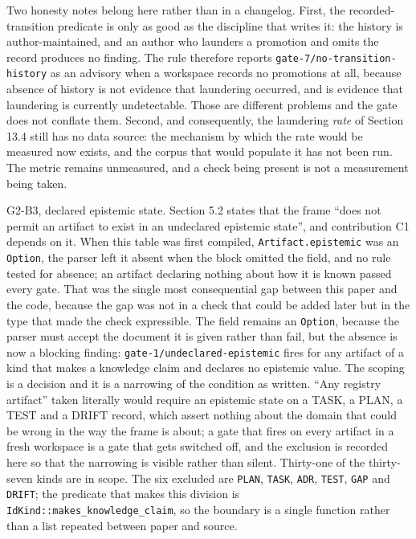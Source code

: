 \documentclass[11pt,a4paper]{article}
\begin{document}
Two honesty notes belong here rather than in a changelog. First, the recorded-transition predicate is only as good as the discipline that writes it: the history is author-maintained, and an author who launders a promotion and omits the record produces no finding. The rule therefore reports \texttt{gate-7/no-transition-history} as an advisory when a workspace records no promotions at all, because absence of history is not evidence that laundering occurred, and is evidence that laundering is currently undetectable. Those are different problems and the gate does not conflate them. Second, and consequently, the laundering \emph{rate} of Section 13.4 still has no data source: the mechanism by which the rate would be measured now exists, and the corpus that would populate it has not been run. The metric remains unmeasured, and a check being present is not a measurement being taken.

G2-B3, declared epistemic state. Section 5.2 states that the frame ``does not permit an artifact to exist in an undeclared epistemic state'', and contribution C1 depends on it. When this table was first compiled, \texttt{Artifact.epistemic} was an \texttt{Option}, the parser left it absent when the block omitted the field, and no rule tested for absence; an artifact declaring nothing about how it is known passed every gate. That was the single most consequential gap between this paper and the code, because the gap was not in a check that could be added later but in the type that made the check expressible. The field remains an \texttt{Option}, because the parser must accept the document it is given rather than fail, but the absence is now a blocking finding: \texttt{gate-1/undeclared-epistemic} fires for any artifact of a kind that makes a knowledge claim and declares no epistemic value. The scoping is a decision and it is a narrowing of the condition as written. ``Any registry artifact'' taken literally would require an epistemic state on a TASK, a PLAN, a TEST and a DRIFT record, which assert nothing about the domain that could be wrong in the way the frame is about; a gate that fires on every artifact in a fresh workspace is a gate that gets switched off, and the exclusion is recorded here so that the narrowing is visible rather than silent. Thirty-one of the thirty-seven kinds are in scope. The six excluded are \texttt{PLAN}, \texttt{TASK}, \texttt{ADR}, \texttt{TEST}, \texttt{GAP} and \texttt{DRIFT}; the predicate that makes this division is \texttt{IdKind::makes\_knowledge\_claim}, so the boundary is a single function rather than a list repeated between paper and source.
\end{document}
